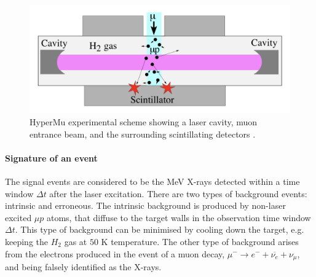 \documentclass[12pt]{article}
\begin{document}
\begin{figure}[h]
\includegraphics[width=1.0\textwidth]{img/targetscheme}
\caption{HyperMu experimental scheme showing a laser cavity, muon entrance beam, and the surrounding scintillating detectors \cite{proposal}.}
\label{fig:targetscheme}
\end{figure}



\paragraph{Signature of an event}\label{para:signature}
The signal events are considered to be the MeV X-rays detected within a time window ${\Delta}t$ after the laser excitation. There are two types of background events: intrinsic and erroneous. The intrinsic background is produced by non-laser excited ${\mu}p$ atoms, that diffuse to the target walls in the observation time window ${\Delta}t$. This type of background can be minimised by cooling down the target, e.g. keeping the $H_2$ gas at $50$ K temperature. The other type of background arises from the electrons produced in the event of a muon decay, ${\mu}^- \rightarrow e^- + \overline{{\nu}_e} + {\nu}_{\mu}$, and being falsely identified as the X-rays. 
\end{document}
